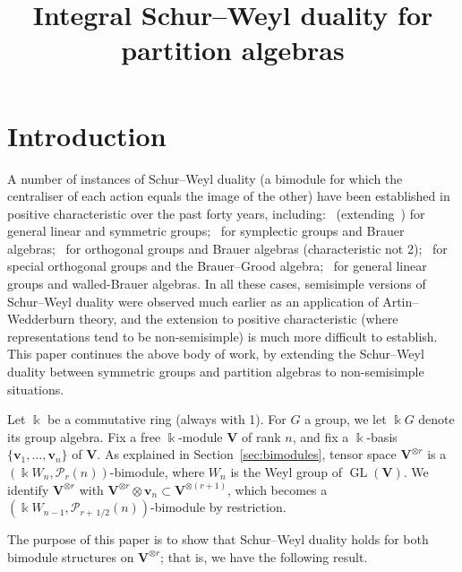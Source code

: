 \documentclass[ALCO,ThmDefs,Unicode,epreuves]{cedram}
\author{\firstname{Chris} \lastname{Bowman}}
\author{\firstname{Stephen} \lastname{Doty}}
\author{\firstname{Stuart} \lastname{Martin}}
\title[Schur--Weyl duality for partition algebras]%
 {Integral Schur--Weyl duality for partition algebras}
\DeclareMathOperator{\GL}{GL}
\newcommand{\Ptn}{\mathcal{P}}
\newcommand{\V}{\mathbf{V}} %
\newcommand{\bv}{\mathbf{v}} %
\newcommand{\half}{\, 1/2} %
\begin{document}
\newtheorem{property}{Property} %


\maketitle

\section*{Introduction}%
A number of instances of Schur--Weyl duality (a bimodule for which the
centraliser of each action equals the image of the other) have been
established in positive characteristic over the past forty years,
including:~\cite{Benson-Doty} (extending~\cite{Carter-Lusztig, dCP,
 Green:book}) for general linear and symmetric groups;~\cite{DDH} for
symplectic groups and Brauer algebras;~\cite{DH} for orthogonal groups
and Brauer algebras (characteristic not 2);~\cite{Garge-Nebhani} for
special orthogonal groups and the Brauer--Grood algebra;~\cite{DDS1,
 DDS2, DD, Donkin} for general linear groups and walled-Brauer
algebras. In all these cases, semisimple versions of Schur--Weyl
duality were observed much earlier as an application of
Artin--Wedderburn theory, and the extension to positive characteristic
(where representations tend to be non-semisimple) is much more
difficult to establish. This paper continues the above body of work, by
extending the Schur--Weyl duality between symmetric groups and
partition algebras to non-semisimple situations.

Let $\Bbbk$ be a commutative ring (always with 1). 
For $G$ a group, we let $\Bbbk G$ denote its group algebra. 
Fix a free
$\Bbbk$-module $\V$ of rank $n$, and fix a $\Bbbk$-basis $\{\bv_1,
\dots, \bv_n\}$ of $\V$. As explained in Section~\ref{sec:bimodules},
tensor space $\V^{\otimes r}$ is a $(\Bbbk W_n, \Ptn_r(n))$-bimodule,
where $W_n$ is the Weyl group of $\GL(\V)$. We identify $\V^{\otimes
 r}$ with $\V^{\otimes r} \otimes \bv_n \subset \V^{\otimes (r+1)}$,
which becomes a $(\Bbbk W_{n-1}, \Ptn_{r+\half}(n))$-bimodule by
restriction.

The purpose of this paper is to show that Schur--Weyl duality holds
for both bimodule structures on $\V^{\otimes r}$; that is, we have
the following result.
\end{document}

